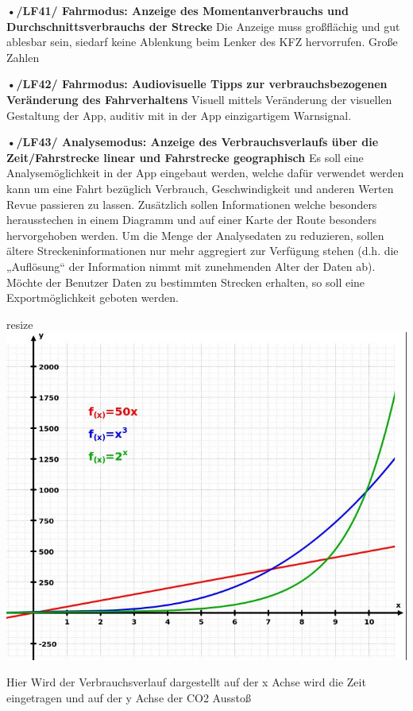 \textbf{•/LF41/ Fahrmodus: Anzeige des Momentanverbrauchs und Durchschnittsverbrauchs der Strecke}
\nextline
Die Anzeige muss großflächig und gut ablesbar sein, siedarf  keine Ablenkung beim Lenker des KFZ hervorrufen. 
Große Zahlen

\textbf{•/LF42/ Fahrmodus: Audiovisuelle Tipps zur verbrauchsbezogenen Veränderung des Fahrverhaltens}
\nextline
Visuell mittels Veränderung der visuellen Gestaltung der App, auditiv mit in der App einzigartigem Warnsignal.

\textbf{•/LF43/ Analysemodus: Anzeige des Verbrauchsverlaufs über die Zeit/Fahrstrecke linear und Fahrstrecke geographisch}
\nextline
Es soll eine Analysemöglichkeit in der App eingebaut werden, welche dafür verwendet werden kann um eine Fahrt bezüglich Verbrauch, Geschwindigkeit und anderen Werten Revue passieren zu lassen. Zusätzlich sollen Informationen welche besonders herausstechen in einem Diagramm und auf einer Karte der Route besonders hervorgehoben werden. Um die Menge der Analysedaten zu reduzieren, sollen ältere Streckeninformationen nur mehr aggregiert zur Verfügung stehen (d.h. die „Auflösung“ der Information nimmt mit zunehmenden Alter der Daten ab). Möchte der Benutzer Daten zu bestimmten Strecken erhalten, so soll eine Exportmöglichkeit geboten werden.

\todo resize
\includegraphics{images/LF43_Diagramm.jpg}

Hier Wird der Verbrauchsverlauf dargestellt auf der x Achse wird die Zeit eingetragen und auf der y Achse der CO2 Ausstoß

